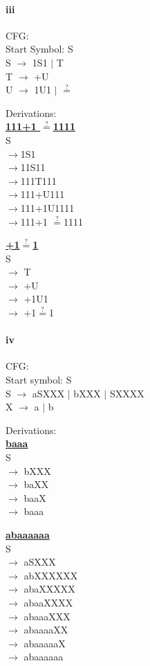 \documentclass[10pt,letter]{article}
\begin{document}
\paragraph{iii} CFG: \\
Start Symbol: S\\
S $\rightarrow$ 1S1 $\mid$ T \\
T $\rightarrow$ +U \\
U $\rightarrow$ 1U1 $\mid$ $\stackrel{?}{=}$

Derivations:\\
\textbf{\underline{111+1 $\stackrel{?}{=}$1111}} \\
S\\
$\rightarrow$1S1 \\
$\rightarrow$11S11 \\
$\rightarrow$111T111 \\
$\rightarrow$111+U111 \\
$\rightarrow$111+1U1111 \\
$\rightarrow$111+1 $\stackrel{?}{=}$1111



\textbf{\underline{+1$\stackrel{?}{=}$1}} \\
S\\
$\rightarrow$ T\\
$\rightarrow$ +U\\
$\rightarrow$ +1U1\\
$\rightarrow$ +1$\stackrel{?}{=}$1

\paragraph{iv} CFG: \\
Start symbol: S \\
S $\rightarrow$ aSXXX $\mid$ bXXX $\mid$ SXXXX \\
X $\rightarrow$ a $\mid$ b

Derivations: \\
\textbf{\underline{baaa}} \\
S\\
$\rightarrow$ bXXX \\
$\rightarrow$ baXX \\
$\rightarrow$ baaX \\
$\rightarrow$ baaa

\textbf{\underline{abaaaaaa}} \\
S\\
$\rightarrow$ aSXXX \\
$\rightarrow$ abXXXXXX \\
$\rightarrow$ abaXXXXX \\
$\rightarrow$ abaaXXXX \\
$\rightarrow$ abaaaXXX \\
$\rightarrow$ abaaaaXX \\
$\rightarrow$ abaaaaaX \\
$\rightarrow$ abaaaaaa 
\end{document}

